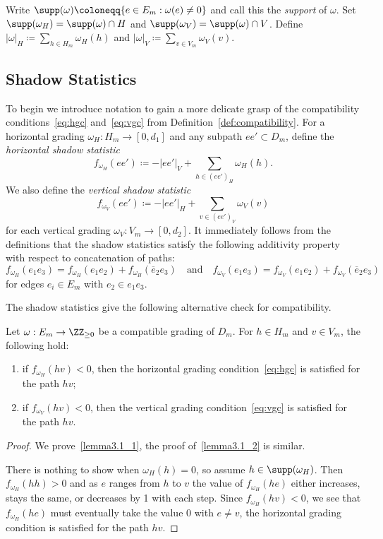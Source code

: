 Write $\supp(\omega)\coloneqq \{e\in E_m:\omega(e)\ne0\}$ and call this the \emph{support} of $\omega$.
Set $\supp(\omega_H)=\supp(\omega)\cap H$ and $\supp(\omega_V)=\supp(\omega)\cap V$.
Define $|\omega|_H\coloneqq \sum\limits_{h\in H_m} \omega_H(h)$ and $|\omega|_V\coloneqq \sum\limits_{v\in V_m} \omega_V(v)$. 

\subsection{Shadow Statistics}
\label{sec:shadows}
To begin we introduce notation to gain a more delicate grasp of the compatibility conditions~\eqref{eq:hgc} and~\eqref{eq:vgc} from Definition~\ref{def:compatibility}.
For a horizontal grading $\omega_H:H_m\to[0,d_1]$ and any subpath $ee'\subset D_m$, define the \emph{horizontal shadow statistic}
\[f_{\omega_H}(ee')\coloneqq -|ee'|_V+\sum\limits_{h\in(ee')_H}\omega_H(h).\]
We also define the \emph{vertical shadow statistic}
\[f_{\omega_V}(ee')\coloneqq -|ee'|_H+\sum\limits_{v\in(ee')_V}\omega_V(v)\]
for each vertical grading $\omega_V:V_m\to[0,d_2]$. 
It immediately follows from the definitions that the shadow statistics satisfy the following additivity property with respect to concatenation of paths:
\begin{equation}
 \label{eq:shadow statistic concatenation}
 f_{\omega_H}(e_1e_3)=f_{\omega_H}(e_1e_2)+f_{\omega_H}(\overline{e}_2e_3)\quad\text{and}\quad f_{\omega_V}(e_1e_3)=f_{\omega_V}(e_1e_2)+f_{\omega_V}(\overline{e}_2e_3)
\end{equation}
for edges $e_i\in E_m$ with $e_2\in e_1e_3$.

The shadow statistics give the following alternative check for compatibility.
\begin{lemma}
 \label{le:compatibility inequality}
 Let $\omega:E_m\to\ZZ_{\ge0}$ be a compatible grading of $D_m$. For $h\in H_m$ and $v\in V_m$, the following hold:
 \begin{enumerate}[label=(\alph*)]
 \item\label{lemma3.1_1} if $f_{\omega_H}(hv)<0$, then the horizontal grading condition~\eqref{eq:hgc} is satisfied for the path $hv$;
 \item\label{lemma3.1_2} if $f_{\omega_V}(hv)<0$, then the vertical grading condition~\eqref{eq:vgc} is satisfied for the path $hv$.
 \end{enumerate}
\end{lemma}
\begin{proof}
 We prove~\ref{lemma3.1_1}, the proof of~\ref{lemma3.1_2} is similar.
 
 There is nothing to show when $\omega_H(h)=0$, so assume $h\in\supp(\omega_H)$.
 Then $f_{\omega_H}(hh)>0$ and as $e$ ranges from $h$ to $v$ the value of $f_{\omega_H}(he)$ either increases, stays the same, or decreases by 1 with each step.
 Since $f_{\omega_H}(hv)<0$, we see that $f_{\omega_H}(he)$ must eventually take the value 0 with $e\ne v$, \ie the horizontal grading condition is satisfied for the path $hv$.
\end{proof}

